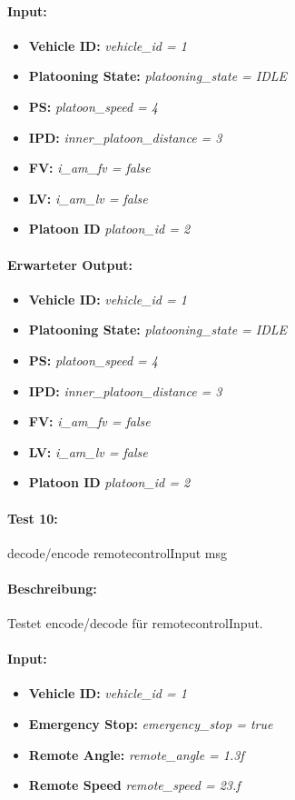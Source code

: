 \documentclass[a4paper, 12pt, titlepage]{scrartcl}
\begin{document}
{			\paragraph{Input:}
			\begin{itemize} \itemsep-0.5em
				\item \textbf{Vehicle ID:} \emph{vehicle\_id = 1}
				\item \textbf{Platooning State:} \emph{platooning\_state = IDLE}
				\item \textbf{PS:} \emph{platoon\_speed = 4}
				\item \textbf{IPD:} \emph{inner\_platoon\_distance = 3}
				\item \textbf{FV:} \emph{i\_am\_fv = false}
				\item \textbf{LV:} \emph{i\_am\_lv = false}
				\item \textbf{Platoon ID} \emph{platoon\_id = 2}
			\end{itemize}
			\paragraph{Erwarteter Output:}
			\begin{itemize} \itemsep-0.5em
				\item \textbf{Vehicle ID:} \emph{vehicle\_id = 1}
				\item \textbf{Platooning State:} \emph{platooning\_state = IDLE}
				\item \textbf{PS:} \emph{platoon\_speed = 4}
				\item \textbf{IPD:} \emph{inner\_platoon\_distance = 3}
				\item \textbf{FV:} \emph{i\_am\_fv = false}
				\item \textbf{LV:} \emph{i\_am\_lv = false}
				\item \textbf{Platoon ID} \emph{platoon\_id = 2}
			\end{itemize}
				
			\paragraph{Test 10:}{decode/encode remotecontrolInput msg}
			\paragraph{Beschreibung:} Testet encode/decode für remotecontrolInput.
			\paragraph{Input:}
			\begin{itemize} \itemsep-0.5em
				\item \textbf{Vehicle ID:} \emph{vehicle\_id = 1}
				\item \textbf{Emergency Stop:} \emph{emergency\_stop = true}
				\item \textbf{Remote Angle:} \emph{remote\_angle = 1.3f}
				\item \textbf{Remote Speed} \emph{remote\_speed = 23.f}
			\end{itemize}
}
\end{document}
